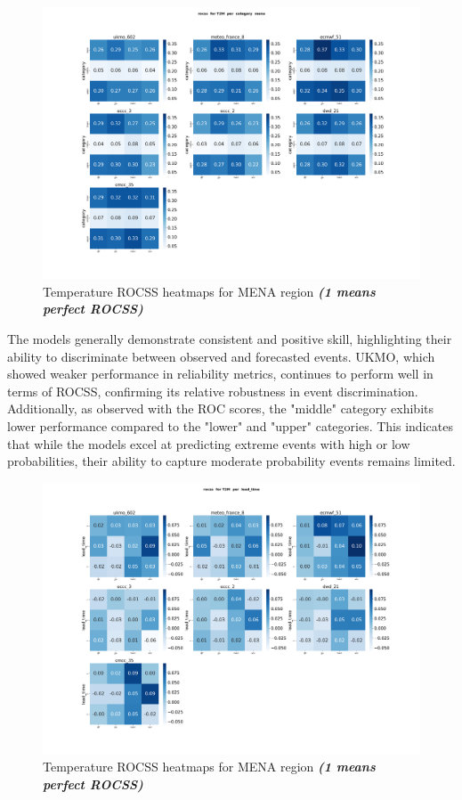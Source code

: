 \begin{figure}[H]
    \centering
    \includegraphics[width=1\linewidth]{plots/prob/rocss/rocss_T2M_category_mena.png}
    \caption{Temperature ROCSS  heatmaps for MENA region \textbf{\textit{(1 means perfect ROCSS)}} }
\end{figure}
The models generally demonstrate consistent and positive skill, highlighting their ability to discriminate between observed and forecasted events. UKMO, which showed weaker performance in reliability metrics, continues to perform well in terms of ROCSS, confirming its relative robustness in event discrimination. Additionally, as observed with the ROC scores, the "middle" category exhibits lower performance compared to the "lower" and "upper" categories. This indicates that while the models excel at predicting extreme events with high or low probabilities, their ability to capture moderate probability events remains limited.

\begin{figure}[H]
    \centering
    \includegraphics[width=1\linewidth]{plots/prob/rocss/rocss_T2M_lead_time.png}
    \caption{Temperature ROCSS  heatmaps for MENA region \textbf{\textit{(1 means perfect ROCSS)}} }
\end{figure}

